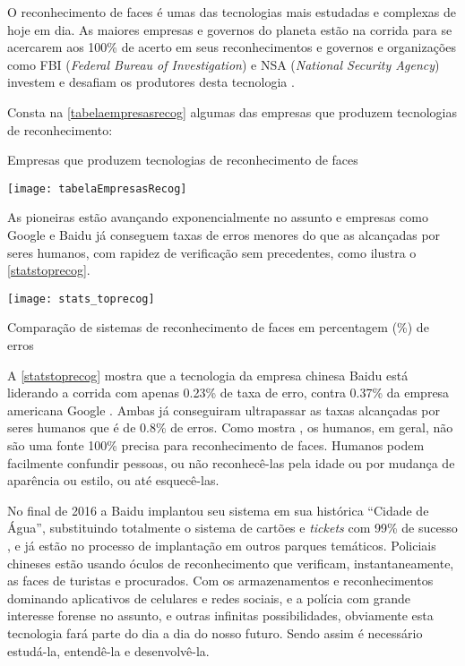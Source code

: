 O reconhecimento de faces é umas das tecnologias mais estudadas e complexas de hoje em dia. As maiores empresas e governos do planeta estão na corrida para se acercarem aos 100\% de acerto em seus reconhecimentos e governos e organizações como FBI (\textit{Federal Bureau of Investigation}) e NSA (\textit{National Security Agency})  investem e desafiam os produtores desta tecnologia \cite{nstc_homeland}.

Consta na \autoref{tabelaempresasrecog} algumas das empresas que produzem tecnologias de reconhecimento:


\begin{table}[h]
	\centering
	\caption{Empresas que produzem tecnologias de reconhecimento de faces}
	\texttt{[image: tabelaEmpresasRecog]}
	\label{tabelaempresasrecog}
\end{table}

As pioneiras estão avançando exponencialmente no assunto e empresas como Google e Baidu já conseguem taxas de erros menores do que as alcançadas por seres humanos, com rapidez de verificação sem precedentes, como ilustra o \autoref{statstoprecog}.

\vspace*{10cm}
\begin{grafico}[h]
	\centering
	\texttt{[image: stats\_toprecog]}
	\caption{Comparação de sistemas de reconhecimento de faces em percentagem (\%) de erros}
	\label{statstoprecog}
\end{grafico}


A \autoref{statstoprecog} mostra que a tecnologia da empresa chinesa Baidu está liderando a corrida com apenas 0.23\% de taxa de erro, contra 0.37\% da empresa americana Google \cite{stats_economy_compass_2017}. Ambas já conseguiram ultrapassar as taxas alcançadas por seres humanos que é de 0.8\% de erros. Como mostra , os humanos, em geral, não são uma fonte 100\% precisa para reconhecimento de faces. Humanos podem facilmente confundir pessoas, ou não reconhecê-las pela idade ou por mudança de aparência ou estilo, ou até esquecê-las.

No final de 2016 a Baidu implantou seu sistema em sua histórica “Cidade de Água”, substituindo totalmente o sistema de cartões e \textit{tickets} com 99\% de sucesso \cite{baidiu_theverge}, e já estão no processo de implantação em outros parques temáticos. Policiais chineses estão usando óculos de reconhecimento que verificam, instantaneamente, as faces de turistas e procurados. Com os armazenamentos e reconhecimentos dominando aplicativos de celulares e redes sociais, e a polícia com grande interesse forense no assunto, e outras infinitas possibilidades, obviamente esta tecnologia fará parte do dia a dia do nosso futuro. Sendo assim é necessário estudá-la, entendê-la e desenvolvê-la.










